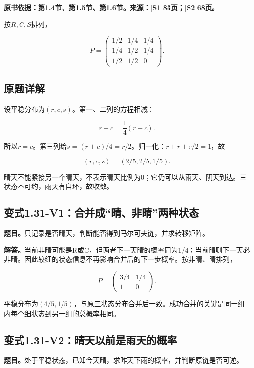\documentclass[
  11pt,
  a4paper,
  UTF8,
  fontset=fandol]{ctexart}
\begin{document}
\textbf{原书依据：第1.4节、第1.5节、第1.6节。来源：{[}S1{]}83页；{[}S2{]}68页。}

按\(R,C,S\)排列，

\[
P=\begin{pmatrix}1/2&1/4&1/4\\1/4&1/2&1/4\\1/2&1/2&0\end{pmatrix}.
\]

\subsection{原题详解}\label{ux539fux9898ux8be6ux89e3-1}

设平稳分布为\((r,c,s)\)。第一、二列的方程相减：

\[
r-c=\frac14(r-c).
\]

所以\(r=c\)。第三列给\(s=(r+c)/4=r/2\)。归一化：\(r+r+r/2=1\)，故

\[
\boxed{(r,c,s)=(2/5,2/5,1/5).}
\]

晴天不能紧接另一个晴天，不表示晴天比例为0；它仍可以从雨天、阴天到达。三状态不可约，雨天有自环，故收敛。

\subsection{变式1.31-V1：合并成``晴、非晴''两种状态}\label{ux53d8ux5f0f1.31-v1ux5408ux5e76ux6210ux6674ux975eux6674ux4e24ux79cdux72b6ux6001}

\textbf{题目。}只记录是否晴天，判断能否得到马尔可夫链，并求转移矩阵。

\textbf{解答。}当前非晴可能是R或C，但两者下一天晴的概率同为1/4；当前晴则下一天必非晴。因此较细的状态信息不再影响合并后的下一步概率。按非晴、晴排列，

\[
\boxed{\bar P=\begin{pmatrix}3/4&1/4\\1&0\end{pmatrix}.}
\]

平稳分布为\((4/5,1/5)\)，与原三状态分布合并后一致。成功合并的关键是同一组内每个细状态到另一组的总概率相同。

\subsection{变式1.31-V2：晴天以前是雨天的概率}\label{ux53d8ux5f0f1.31-v2ux6674ux5929ux4ee5ux524dux662fux96e8ux5929ux7684ux6982ux7387}

\textbf{题目。}处于平稳状态，已知今天晴，求昨天下雨的概率，并判断原链是否可逆。
\end{document}
